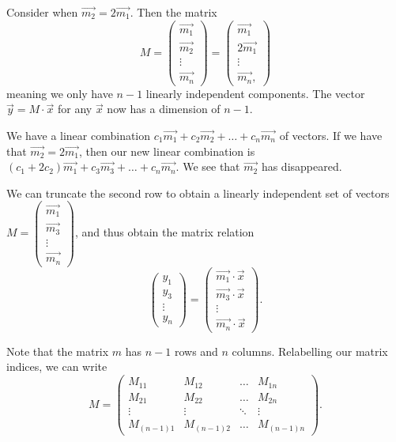 \documentclass[a4paper, 12pt,oneside,openany]{book}
\begin{document}
Consider when $\vec{m_2} = 2 \vec{m_1}$. Then the matrix $$M = \begin{pmatrix} \vec{m_1} \\ \vec{m_2} \\ \vdots \\  \vec{m_n} \end{pmatrix} = \begin{pmatrix} \vec{m_1} \\ 2\vec{m_1} \\ \vdots \\ \vec{m_n}, \end{pmatrix}$$ meaning we only have $n-1$ linearly independent components. The vector $\vec{y} = M \cdot \vec{x}$ for any $\vec{x}$ now has a dimension of $n-1$. 

We have a linear combination $c_1\vec{m_1} + c_2\vec{m_2} + \dots + c_n \vec{m_n}$ of vectors. If we have that $\vec{m_2}=2\vec{m_1}$, then our new linear combination is $(c_1+2c_2)\vec{m_1} + c_3\vec{m_3} + \dots + c_n \vec{m_n}$. We see that $\vec{m_2}$ has disappeared. 

We can truncate the second row to obtain a linearly independent set of vectors $M=\begin{pmatrix} \vec{m_1} \\ \vec{m_3} \\ \vdots \\ \vec{m_n} \end{pmatrix}$, and thus obtain the matrix relation $$\begin{pmatrix} y_1 \\ y_3 \\ \vdots \\ y_n \end{pmatrix} = \begin{pmatrix} \vec{m_1} \cdot \vec{x} \\ \vec{m_3} \cdot \vec{x} \\ \vdots \\ \vec{m_n} \cdot \vec{x} \end{pmatrix}.$$ 

Note that the matrix $m$ has $n-1$ rows and $n$ columns. Relabelling our matrix indices, we can write $$M=\begin{pmatrix} M_{11} & M_{12} & \dots & M_{1n} \\ M_{21} & M_{22} & \dots & M_{2n} \\ \vdots & \vdots & \ddots & \vdots \\ M_{(n-1)1} & M_{(n-1)2} & \dots & M_{(n-1)n}\end{pmatrix}.$$
\end{document}

